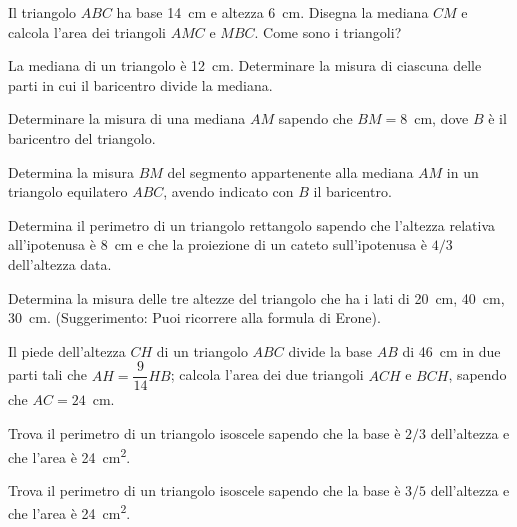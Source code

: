 \begin{multicols}{2}
\begin{esercizio}
\label{ese:7.73}
Il triangolo $ABC$ ha base 14~cm e altezza 6~cm. Disegna la mediana $CM$ e calcola l'area dei triangoli $AMC$ e $MBC$. Come sono i triangoli?
\end{esercizio}

\begin{esercizio}
\label{ese:7.74}
La mediana di un triangolo è 12~cm. Determinare la misura di ciascuna delle parti in cui il baricentro divide la mediana.
\end{esercizio}

\begin{esercizio}
\label{ese:7.75}
Determinare la misura di una mediana $AM$ sapendo che $BM=8$~cm, dove $B$ è il baricentro del triangolo.
\end{esercizio}

\begin{esercizio}
\label{ese:7.76}
Determina la misura $BM$ del segmento appartenente alla mediana $AM$ in un triangolo equilatero $ABC$, avendo indicato con $B$ il baricentro. 
\end{esercizio}

\begin{esercizio}
\label{ese:7.77}
Determina il perimetro di un triangolo rettangolo sapendo che l'altezza relativa all'ipotenusa è 8~cm e che la proiezione di un cateto sull'ipotenusa è $4/3$ dell'altezza data.
\end{esercizio}

\begin{esercizio}
\label{ese:7.78}
Determina la misura delle tre altezze del triangolo che ha i lati di 20~cm, 40~cm, 30~cm. (Suggerimento: Puoi ricorrere alla formula di Erone).
\end{esercizio}

\begin{esercizio}
\label{ese:7.79}
Il piede dell'altezza $CH$ di un triangolo $ABC$ divide la base $AB$ di 46~cm in due parti tali che $AH=\dfrac{9}{14}HB$; calcola l'area dei due triangoli $ACH$ e $BCH$, sapendo che $AC=24$~cm.
\end{esercizio}

\begin{esercizio}
\label{ese:7.80}
Trova il perimetro di un triangolo isoscele sapendo che la base è $2/3$ dell'altezza e che l'area è 24~cm\textsuperscript{2}.
\end{esercizio}

\begin{esercizio}
\label{ese:7.81}
Trova il perimetro di un triangolo isoscele sapendo che la base è $3/5$ dell'altezza e che l'area è 24~cm\textsuperscript{2}.
\end{esercizio}


\end{multicols}
